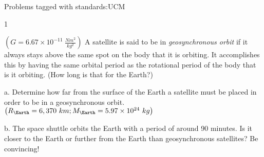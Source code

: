 

{\Large Problems tagged with standards:}UCM
\bigskip 

\AddToShipoutPicture*{\BackgroundPic}

\addtocounter {ProbNum} {1}

{\bf \Large{}} ${\left ( G = 6.67 \times 10^{-11}~\tfrac{Nm^2}{kg^2} \right )}$ A satellite is said to be in \emph{geosynchronous orbit} if it always stays above the same spot on the body that it is orbiting.  It accomplishes this by having the same orbital period as the rotational period of the body that is it orbiting. (How long is that for the Earth?)

\bigskip

a. Determine how far from the surface of the Earth a satellite must be placed in order to be in a geosynchronous orbit. ${\left ( R_{\Earth} = 6,370~km; M_{\Earth}=5.97 \times 10^{24}~kg \right )}$

\vfill

b. The space shuttle orbits the Earth with a period of around 90 minutes.  Is it closer to the Earth or further from the Earth than geosynchronous satellites?  Be convincing!

\vspace{25mm}
 
\newpage
